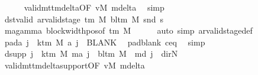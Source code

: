 \begin{isabellebody}
\ \ \ \ \isamarkupfalse%
\ valid{\isacharunderscore}{\kern0pt}mttm{\isacharunderscore}{\kern0pt}delta{\isacharparenleft}{\kern0pt}{}{\isacharparenright}{\kern0pt}{\isacharbrackleft}{\kern0pt}OF\ vM\ mdelta{\isacharbrackright}{\kern0pt}\ \isamarkupfalse%
\ simp\isanewline
\ \ \isamarkupfalse%
\ dst{\isacharunderscore}{\kern0pt}valid{\isacharcolon}{\kern0pt}\ {\isachardoublequoteopen}ar{\isacharunderscore}{\kern0pt}valid{\isacharunderscore}{\kern0pt}stage\ {\isacharparenleft}{\kern0pt}{\isasymGamma}{\isacharunderscore}{\kern0pt}tm\ M{\isacharparenright}{\kern0pt}\ {\isacharparenleft}{\kern0pt}bl{\isacharunderscore}{\kern0pt}tm\ M{\isacharparenright}{\kern0pt}\ {\isacharparenleft}{\kern0pt}snd\ {\isacharquery}{\kern0pt}s{\isacharprime}{\kern0pt}{\isacharparenright}{\kern0pt}{\isachardoublequoteclose}\isanewline
\ \ \ \ \isamarkupfalse%
\ ma{\isacharprime}{\kern0pt}{\isacharunderscore}{\kern0pt}gamma\ block{\isacharunderscore}{\kern0pt}width{\isacharunderscore}{\kern0pt}pos{\isacharbrackleft}{\kern0pt}of\ {\isachardoublequoteopen}{\isasymGamma}{\isacharunderscore}{\kern0pt}tm\ M{\isachardoublequoteclose}{\isacharbrackright}{\kern0pt}\isanewline
\ \ \ \ \isamarkupfalse%
\ {\isacharparenleft}{\kern0pt}auto\ simp{\isacharcolon}{\kern0pt}\ ar{\isacharunderscore}{\kern0pt}valid{\isacharunderscore}{\kern0pt}stage{\isacharunderscore}{\kern0pt}def{\isacharparenright}{\kern0pt}\isanewline
\ \ \isamarkupfalse%
\ pad{\isacharunderscore}{\kern0pt}a{\isacharcolon}{\kern0pt}\ {\isachardoublequoteopen}{\isasymforall}j\ {\isasymge}\ k{\isacharunderscore}{\kern0pt}tm\ M{\isachardot}{\kern0pt}\ {\isacharquery}{\kern0pt}a\ j\ {\isacharequal}{\kern0pt}\ BLANK{}{\isachardoublequoteclose}\ \isamarkupfalse%
\ pad{\isacharunderscore}{\kern0pt}blank\ c{\isacharprime}{\kern0pt}{\isacharunderscore}{\kern0pt}eq\ \isamarkupfalse%
\ simp\isanewline
\ \ \isamarkupfalse%
\ dsupp{\isacharcolon}{\kern0pt}\ {\isachardoublequoteopen}{\isasymforall}j\ {\isasymge}\ k{\isacharunderscore}{\kern0pt}tm\ M{\isachardot}{\kern0pt}\ m{\isacharunderscore}{\kern0pt}a{\isacharprime}{\kern0pt}\ j\ {\isacharequal}{\kern0pt}\ bl{\isacharunderscore}{\kern0pt}tm\ M\ {\isasymand}\ m{\isacharunderscore}{\kern0pt}d\ j\ {\isacharequal}{\kern0pt}\ dir{\isachardot}{\kern0pt}N{\isachardoublequoteclose}\isanewline
\ \ \ \ \isamarkupfalse%
\ valid{\isacharunderscore}{\kern0pt}mttm{\isacharunderscore}{\kern0pt}delta{\isacharunderscore}{\kern0pt}support{\isacharbrackleft}{\kern0pt}OF\ vM\ mdelta{\isacharbrackright}{\kern0pt}\ \isamarkupfalse%

\end{isabellebody}
